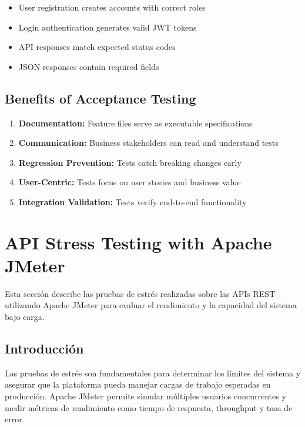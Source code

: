 \documentclass[12pt,a4paper]{article}
\begin{document}
\begin{itemize}
    \item User registration creates accounts with correct roles
    \item Login authentication generates valid JWT tokens
    \item API responses match expected status codes
    \item JSON responses contain required fields
\end{itemize}

\subsection{Benefits of Acceptance Testing}

\begin{enumerate}
    \item \textbf{Documentation:} Feature files serve as executable specifications
    \item \textbf{Communication:} Business stakeholders can read and understand tests
    \item \textbf{Regression Prevention:} Tests catch breaking changes early
    \item \textbf{User-Centric:} Tests focus on user stories and business value
    \item \textbf{Integration Validation:} Tests verify end-to-end functionality
\end{enumerate}

\section{API Stress Testing with Apache JMeter}

Esta sección describe las pruebas de estrés realizadas sobre las APIs REST utilizando Apache JMeter para evaluar el rendimiento y la capacidad del sistema bajo carga.

\subsection{Introducción}

Las pruebas de estrés son fundamentales para determinar los límites del sistema y asegurar que la plataforma pueda manejar cargas de trabajo esperadas en producción. Apache JMeter permite simular múltiples usuarios concurrentes y medir métricas de rendimiento como tiempo de respuesta, throughput y tasa de error.
\end{document}
